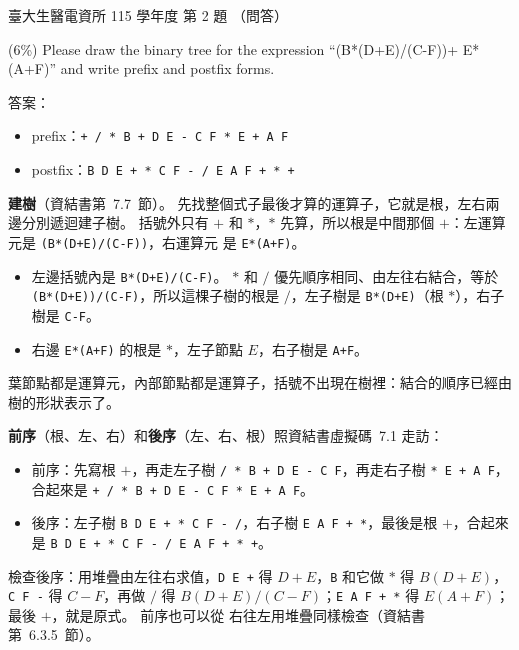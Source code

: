 \begin{pastexam}[label={px:ntu-115-bmei-alg-02}]{臺大生醫電資所 115 學年度 第 2 題}
（問答）

(6\%) Please draw the binary tree for the expression ``(B*(D+E)/(C-F))+ E*(A+F)'' and write prefix
and postfix forms.
\end{pastexam}

\begin{pastsoln}
答案：
\begin{itemize}
\item prefix：\texttt{+ / * B + D E - C F * E + A F}
\item postfix：\texttt{B D E + * C F - / E A F + * +}
\end{itemize}

\textbf{建樹}（資結書第~7.7~節）。 先找整個式子最後才算的運算子，它就是根，左右兩邊分別遞迴建子樹。
括號外只有 $+$ 和 $*$，$*$ 先算，所以根是中間那個 $+$：左運算元是 \texttt{(B*(D+E)/(C-F))}，右運算元
是 \texttt{E*(A+F)}。
\begin{itemize}
\item 左邊括號內是 \texttt{B*(D+E)/(C-F)}。 $*$ 和 $/$ 優先順序相同、由左往右結合，等於
\texttt{(B*(D+E))/(C-F)}，所以這棵子樹的根是 $/$，左子樹是 \texttt{B*(D+E)}（根 $*$），右子樹是 \texttt{C-F}。
\item 右邊 \texttt{E*(A+F)} 的根是 $*$，左子節點 $E$，右子樹是 \texttt{A+F}。
\end{itemize}
\begin{center}
\end{center}
葉節點都是運算元，內部節點都是運算子，括號不出現在樹裡：結合的順序已經由樹的形狀表示了。

\textbf{前序}（根、左、右）和\textbf{後序}（左、右、根）照資結書虛擬碼~7.1 走訪：
\begin{itemize}
\item 前序：先寫根 $+$，再走左子樹 \texttt{/ * B + D E - C F}，再走右子樹 \texttt{* E + A F}，
合起來是 \texttt{+ / * B + D E - C F * E + A F}。
\item 後序：左子樹 \texttt{B D E + * C F - /}，右子樹 \texttt{E A F + *}，最後是根 $+$，合起來是
\texttt{B D E + * C F - / E A F + * +}。
\end{itemize}
檢查後序：用堆疊由左往右求值，\texttt{D E +} 得 $D+E$，\texttt{B} 和它做 $*$ 得 $B(D+E)$，\texttt{C F -}
得 $C-F$，再做 $/$ 得 $B(D+E)/(C-F)$；\texttt{E A F + *} 得 $E(A+F)$；最後 $+$，就是原式。 前序也可以從
右往左用堆疊同樣檢查（資結書第~6.3.5~節）。
\end{pastsoln}
